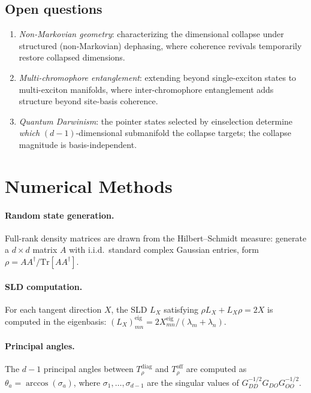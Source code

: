 \documentclass[12pt,a4paper]{article}
\theoremstyle{definition}
\theoremstyle{remark}
\begin{document}
\subsection{Open questions}

\begin{enumerate}
\item \emph{Non-Markovian geometry}: characterizing the dimensional collapse under structured (non-Markovian) dephasing, where coherence revivals temporarily restore collapsed dimensions.
\item \emph{Multi-chromophore entanglement}: extending beyond single-exciton states to multi-exciton manifolds, where inter-chromophore entanglement adds structure beyond site-basis coherence.
\item \emph{Quantum Darwinism}: the pointer states selected by einselection \cite{zurek2003decoherence,zurek2025decoherence} determine \emph{which} $(d{-}1)$-dimensional submanifold the collapse targets; the collapse magnitude is basis-independent.
\end{enumerate}




\appendix
\section{Numerical Methods}
\label{app:numerics}

\paragraph{Random state generation.}
Full-rank density matrices are drawn from the Hilbert--Schmidt measure: generate a $d \times d$ matrix $A$ with i.i.d.\ standard complex Gaussian entries, form $\rho = AA^\dagger/\mathrm{Tr}[AA^\dagger]$.

\paragraph{SLD computation.}
For each tangent direction $X$, the SLD $L_X$ satisfying $\rho L_X + L_X \rho = 2X$ is computed in the eigenbasis: $(L_X)_{mn}^{\mathrm{eig}} = 2X_{mn}^{\mathrm{eig}}/(\lambda_m + \lambda_n)$.

\paragraph{Principal angles.}
The $d - 1$ principal angles between $T_\rho^{\mathrm{diag}}$ and $T_\rho^{\mathrm{off}}$ are computed as $\theta_a = \arccos(\sigma_a)$, where $\sigma_1, \ldots, \sigma_{d-1}$ are the singular values of $G_{DD}^{-1/2} G_{DO} G_{OO}^{-1/2}$.
\end{document}
